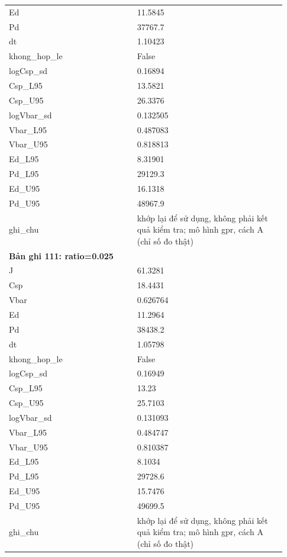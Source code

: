 \begin{longtable}{p{0.43\linewidth}p{0.50\linewidth}}
Ed & 11.5845 \\
Pd & 37767.7 \\
dt & 1.10423 \\
khong\_\allowbreak hop\_\allowbreak le & False \\
logCsp\_\allowbreak sd & 0.16894 \\
Csp\_\allowbreak L95 & 13.5821 \\
Csp\_\allowbreak U95 & 26.3376 \\
logVbar\_\allowbreak sd & 0.132505 \\
Vbar\_\allowbreak L95 & 0.487083 \\
Vbar\_\allowbreak U95 & 0.818813 \\
Ed\_\allowbreak L95 & 8.31901 \\
Pd\_\allowbreak L95 & 29129.3 \\
Ed\_\allowbreak U95 & 16.1318 \\
Pd\_\allowbreak U95 & 48967.9 \\
ghi\_\allowbreak chu & khớp lại để sử dụng, không phải kết quả kiểm tra; mô hình gpr, cách A (chỉ số đo thật) \\
\midrule
\multicolumn{2}{p{0.95\linewidth}}{\textbf{Bản ghi 111: ratio=0.025}} \\
J & 61.3281 \\
Csp & 18.4431 \\
Vbar & 0.626764 \\
Ed & 11.2964 \\
Pd & 38438.2 \\
dt & 1.05798 \\
khong\_\allowbreak hop\_\allowbreak le & False \\
logCsp\_\allowbreak sd & 0.16949 \\
Csp\_\allowbreak L95 & 13.23 \\
Csp\_\allowbreak U95 & 25.7103 \\
logVbar\_\allowbreak sd & 0.131093 \\
Vbar\_\allowbreak L95 & 0.484747 \\
Vbar\_\allowbreak U95 & 0.810387 \\
Ed\_\allowbreak L95 & 8.1034 \\
Pd\_\allowbreak L95 & 29728.6 \\
Ed\_\allowbreak U95 & 15.7476 \\
Pd\_\allowbreak U95 & 49699.5 \\
ghi\_\allowbreak chu & khớp lại để sử dụng, không phải kết quả kiểm tra; mô hình gpr, cách A (chỉ số đo thật) \\

\end{longtable}
